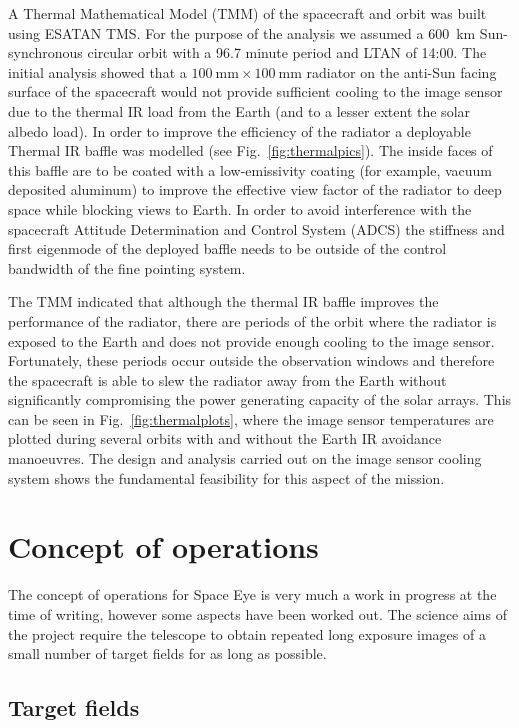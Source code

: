 \documentclass[]{iac}
\begin{document}
A Thermal Mathematical Model (TMM) of the spacecraft and orbit was built using ESATAN TMS. For the purpose of the
analysis we assumed a \SI{600}{\kilo\metre} Sun-synchronous circular orbit with a 96.7 minute period and LTAN of 14:00.
The initial analysis showed that a $\SI{100}{\milli\metre} \times \SI{100}{\milli\metre}$ radiator on the anti-Sun
facing surface of the spacecraft would not provide sufficient cooling to the image sensor due to the thermal IR load
from the Earth (and to a lesser extent the solar albedo load). In order to improve the efficiency of the radiator a
deployable Thermal IR baffle was modelled (see Fig.~\ref{fig:thermalpics}). The inside faces of this baffle are to be
coated with a low-emissivity coating (for example, vacuum deposited aluminum) to improve the effective view factor of
the radiator to deep space while blocking views to Earth. In order to avoid interference with the spacecraft Attitude
Determination and Control System (ADCS) the stiffness and first eigenmode of the deployed baffle needs to be outside of
the control bandwidth of the fine pointing system.

The TMM indicated that although the thermal IR baffle improves the performance of the radiator, there are periods of the
orbit where the radiator is exposed to the Earth and does not provide enough cooling to the image sensor. Fortunately,
these periods occur outside the observation windows and therefore the spacecraft is able to slew the radiator away from
the Earth without significantly compromising the power generating capacity of the solar arrays. This can be seen in
Fig.~\ref{fig:thermalplots}, where the image sensor temperatures are plotted during several orbits with and without the
Earth IR avoidance manoeuvres. The design and analysis carried out on the image sensor cooling system shows the
fundamental feasibility for this aspect of the mission.

\section{Concept of operations}
\label{sec:conops}

The concept of operations for Space Eye is very much a work in progress at the time of writing, however some aspects
have been worked out. The science aims of the project require the telescope to obtain repeated long exposure images of a
small number of target fields for as long as possible.

\subsection{Target fields}
\end{document}
